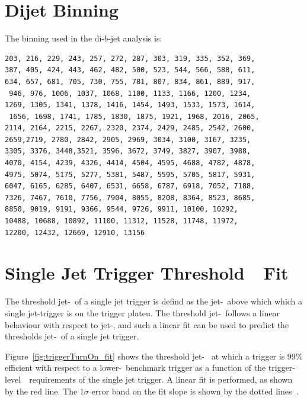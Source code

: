 
\appendix
\chapter{Dijet Binning}
\label{app:dijet_bins}

\noindent
The binning used in the di-$b$-jet analysis is:
\begin{verbatim}
203, 216, 229, 243, 257, 272, 287, 303, 319, 335, 352, 369,
387, 405, 424, 443, 462, 482, 500, 523, 544, 566, 588, 611, 
634, 657, 681, 705, 730, 755, 781, 807, 834, 861, 889, 917,
 946, 976, 1006, 1037, 1068, 1100, 1133, 1166, 1200, 1234, 
1269, 1305, 1341, 1378, 1416, 1454, 1493, 1533, 1573, 1614,
 1656, 1698, 1741, 1785, 1830, 1875, 1921, 1968, 2016, 2065, 
2114, 2164, 2215, 2267, 2320, 2374, 2429, 2485, 2542, 2600, 
2659,2719, 2780, 2842, 2905, 2969, 3034, 3100, 3167, 3235, 
3305, 3376, 3448,3521, 3596, 3672, 3749, 3827, 3907, 3988, 
4070, 4154, 4239, 4326, 4414, 4504, 4595, 4688, 4782, 4878, 
4975, 5074, 5175, 5277, 5381, 5487, 5595, 5705, 5817, 5931, 
6047, 6165, 6285, 6407, 6531, 6658, 6787, 6918, 7052, 7188, 
7326, 7467, 7610, 7756, 7904, 8055, 8208, 8364, 8523, 8685, 
8850, 9019, 9191, 9366, 9544, 9726, 9911, 10100, 10292, 
10488, 10688, 10892, 11100, 11312, 11528, 11748, 11972, 
12200, 12432, 12669, 12910, 13156
\end{verbatim}

\chapter{Single Jet Trigger Threshold~\pT~Fit}
\label{app:triggerTurnOn_fit}

The threshold jet-\pT~of a single jet trigger is defind as the jet-\pT~above
which which a single jet-trigger is on the trigger plateu.
The threshold jet-\pT~follows a linear behaviour with respect to jet-\pT,
and such a linear fit can be used to predict the thresholds jet-\pT~of a single jet trigger.

Figure~\ref{fig:triggerTurnOn_fit} shows the threshold jet-\pT~
at which a trigger is 99\% efficient with respect to a lower-\pT~benchmark trigger
as a function of the trigger-level~\pT~requirements of the single jet trigger.
A linear fit is performed, as shown by the red line.
The 1$\sigma$ error band on the fit slope is shown by the dotted lines~\cite{evt-jet_turnOnFit}.

